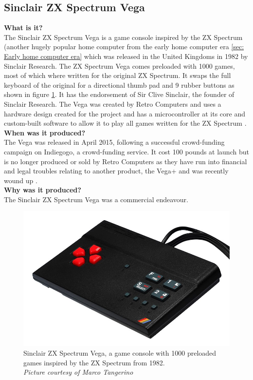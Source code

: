 \subsection{Sinclair ZX Spectrum Vega}
\textbf{What is it?}\\
The Sinclair ZX Spectrum Vega is a game console inspired by the ZX Spectrum (another hugely popular home computer from the early home computer era \ref{sec: Early home computer era} which was released in the United Kingdoms in 1982 by Sinclair Research. The ZX Spectrum Vega comes preloaded with 1000 games, most of which where written for the original ZX Spectrum. It swaps the full keyboard of the original for a directional thumb pad and 9 rubber buttons as shown in figure \ref{Spectrum_Vega}. It has the endorsement of Sir Clive Sinclair, the founder of Sinclair Research. The Vega was created by Retro Computers and uses a hardware design created for the project and has a microcontroller at its core and custom-built software to allow it to play all games written for the ZX Spectrum 
\cite{RN119}.\\

\textbf{When was it produced?}\\
The Vega was released in April 2015, following a successful crowd-funding campaign on Indiegogo, a crowd-funding service. It cost 100 pounds at launch but is no longer produced or sold by Retro Computers as they have run into financial and legal troubles relating to another product, the Vega+ and was recently wound up 
\cite{RN120}.  \\

\textbf{Why was it produced?}\\
The Sinclair ZX Spectrum Vega was a commercial endeavour. \\

\begin{figure} \begin{center}
\includegraphics[width=.3\linewidth]{pics/Spectrum_Vega} 
\end{center} 
\caption{Sinclair ZX Spectrum Vega, a game console with 1000 preloaded games inspired by the ZX Spectrum from 1982. \\ \textit{\small{Picture courtesy of Marco Tangerino}}}
\label{Spectrum_Vega}
\end{figure} 

